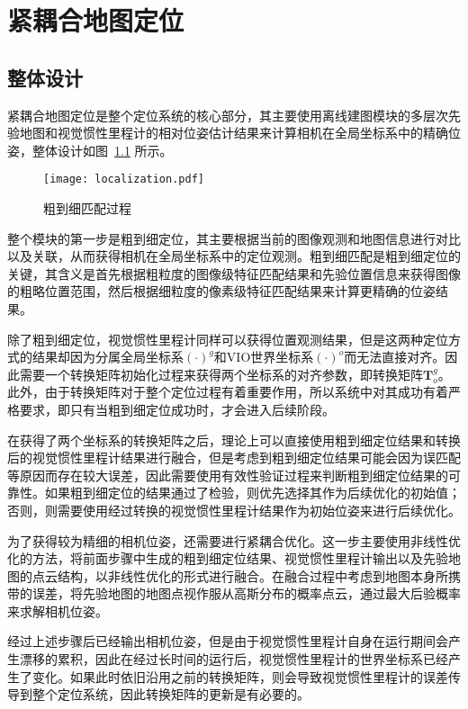 
\chapter{紧耦合地图定位}

\section{整体设计}

紧耦合地图定位是整个定位系统的核心部分，其主要使用离线建图模块的多层次先验地图和视觉惯性里程计的相对位姿估计结果来计算相机在全局坐标系中的精确位姿，整体设计如图~\ref{fig:localization} 所示。

\begin{figure}
  \centering
  \texttt{[image: localization.pdf]}
  \caption{粗到细匹配过程}
  \label{fig:localization}
\end{figure}

整个模块的第一步是粗到细定位，其主要根据当前的图像观测和地图信息进行对比以及关联，从而获得相机在全局坐标系中的定位观测。粗到细匹配是粗到细定位的关键，其含义是首先根据粗粒度的图像级特征匹配结果和先验位置信息来获得图像的粗略位置范围，然后根据细粒度的像素级特征匹配结果来计算更精确的位姿结果。

除了粗到细定位，视觉惯性里程计同样可以获得位置观测结果，但是这两种定位方式的结果却因为分属全局坐标系$(\cdot)^{g}$和VIO世界坐标系$(\cdot)^{o}$而无法直接对齐。因此需要一个转换矩阵初始化过程来获得两个坐标系的对齐参数，即转换矩阵$\symbf{T}_o^{g}$。此外，由于转换矩阵对于整个定位过程有着重要作用，所以系统中对其成功有着严格要求，即只有当粗到细定位成功时，才会进入后续阶段。

在获得了两个坐标系的转换矩阵之后，理论上可以直接使用粗到细定位结果和转换后的视觉惯性里程计结果进行融合，但是考虑到粗到细定位结果可能会因为误匹配等原因而存在较大误差，因此需要使用有效性验证过程来判断粗到细定位结果的可靠性。如果粗到细定位的结果通过了检验，则优先选择其作为后续优化的初始值；否则，则需要使用经过转换的视觉惯性里程计结果作为初始位姿来进行后续优化。

为了获得较为精细的相机位姿，还需要进行紧耦合优化。这一步主要使用非线性优化的方法，将前面步骤中生成的粗到细定位结果、视觉惯性里程计输出以及先验地图的点云结构，以非线性优化的形式进行融合。在融合过程中考虑到地图本身所携带的误差，将先验地图的地图点视作服从高斯分布的概率点云，通过最大后验概率来求解相机位姿。

经过上述步骤后已经输出相机位姿，但是由于视觉惯性里程计自身在运行期间会产生漂移的累积，因此在经过长时间的运行后，视觉惯性里程计的世界坐标系已经产生了变化。如果此时依旧沿用之前的转换矩阵，则会导致视觉惯性里程计的误差传导到整个定位系统，因此转换矩阵的更新是有必要的。


